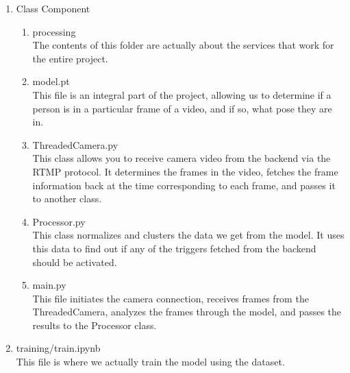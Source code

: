 \begin{enumerate}
      \item Class Component\\
            \begin{enumerate}
                  \item processing\\
                        The contents of this folder are actually about the services that work for the entire project.\\

                  \item model.pt\\
                        This file is an integral part of the project, allowing us to determine if a person is in a particular frame of a video, and if so, what pose they are in.\\

                  \item ThreadedCamera.py\\
                        This class allows you to receive camera video from the backend via the RTMP protocol. It determines the frames in the video, fetches the frame information back at the time corresponding to each frame, and passes it to another class.\\

                  \item Processor.py\\
                        This class normalizes and clusters the data we get from the model. It uses this data to find out if any of the triggers fetched from the backend should be activated. \\

                  \item main.py\\
                        This file initiates the camera connection, receives frames from the ThreadedCamera, analyzes the frames through the model, and passes the results to the Processor class.\\
            \end{enumerate}

      \item training/train.ipynb\\
            This file is where we actually train the model using the dataset.\\
\end{enumerate}